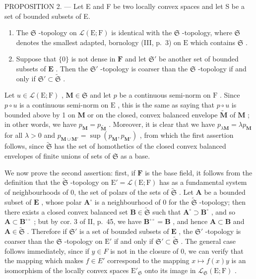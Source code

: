 PROPOSITION 2. --- Let E and F be two locally convex spaces and let S be a set of bounded subsets of E.

\begin{enumerate}
\def\labelenumi{\arabic{enumi})}
\item
  The \(\mathfrak{S}\) -topology on \(\mathcal{L}(\mathrm{E};\mathrm{F})\) is identical with the \(\mathfrak{S}\) -topology, where \(\mathfrak{S}\) denotes the smallest adapted, bornology (III, p.~3) on \(\mathrm{E}\) which contains \(\mathfrak{S}\) .
\item
  Suppose that \(\{0\}\) is not dense in \(\mathbf{F}\) and let \(\mathfrak{S}'\) be another set of bounded subsets of \(\mathbf{E}\) . Then the \(\mathfrak{S}'\) -topology is coarser than the \(\mathfrak{S}\) -topology if and only if \(\mathfrak{S}' \subset \tilde{\mathfrak{S}}\) .
\end{enumerate}

Let \(u \in \mathcal{L}(\mathrm{E};\mathrm{F})\) , \(\mathbf{M} \in \mathfrak{S}\) and let \(p\) be a continuous semi-norm on \(\mathrm{F}\) . Since \(p \circ u\) is a continuous semi-norm on \(\mathrm{E}\) , this is the same as saying that \(p \circ u\) is bounded above by 1 on \(\mathbf{M}\) or on the closed, convex balanced envelope \(\tilde{\mathbf{M}}\) of \(\mathbf{M}\) ; in other words, we have \(p_{\mathbf{M}} = p_{\tilde{\mathbf{M}}}\) . Moreover, it is clear that we have \(p_{\lambda \mathbf{M}} = \lambda p_{\mathbf{M}}\) for all \(\lambda > 0\) and \(p_{\mathbf{M} \cup \mathbf{M}'} = \sup(p_{\mathbf{M}}, p_{\mathbf{M}'})\) , from which the first assertion follows, since \(\tilde{\mathfrak{S}}\) has the set of homothetics of the closed convex balanced envelopes of finite unions of sets of \(\mathfrak{S}\) as a base.

We now prove the second assertion: first, if \(\mathbf{F}\) is the base field, it follows from the definition that the \(\tilde{\mathfrak{S}}\) -topology on \(\mathrm{E}' = \mathcal{L}(\mathrm{E};\mathrm{F})\) has as a fundamental system of neighbourhoods of 0, the set of polars of the sets of \(\tilde{\mathfrak{S}}\) . Let \(\mathbf{A}\) be a bounded subset of \(\mathbf{E}\) , whose polar \(\mathbf{A}^{\circ}\) is a neighbourhood of 0 for the \(\tilde{\mathfrak{S}}\) -topology; then there exists a closed convex balanced set \(\mathbf{B} \in \tilde{\mathfrak{S}}\) such that \(\mathbf{A}^{\circ} \supset \mathbf{B}^{\circ}\) , and so \(\mathbf{A} \subset \mathbf{B}^{\circ \circ}\) ; but by cor. 3 of II, p.~45, we have \(\mathbf{B}^{\circ \circ} = \mathbf{B}\) , and hence \(\mathbf{A} \subset \mathbf{B}\) and \(\mathbf{A} \in \tilde{\mathfrak{S}}\) . Therefore if \(\mathfrak{S}'\) is a set of bounded subsets of \(\mathbf{E}\) , the \(\mathfrak{S}'\) -topology is coarser than the \(\mathfrak{S}\) -topology on \(\mathrm{E}'\) if and only if \(\mathfrak{S}' \subset \tilde{\mathfrak{S}}\) . The general case follows immediately, since if \(y \in F\) is not in the closure of 0, we can verify that the mapping which makes \(f \in E'\) correspond to the mapping \(x \mapsto f(x)y\) is an isomorphism of the locally convex spaces \(\mathrm{E}'_{\mathfrak{S}}\) onto its image in \(\mathcal{L}_{\mathfrak{S}}(\mathrm{E};\mathrm{F})\) .

